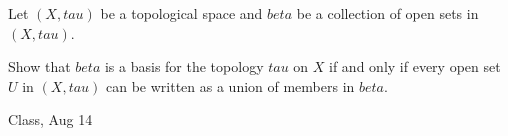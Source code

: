\begin{samepage}
\begin{ex}
Let $(X, tau)$ be a topological space and $beta$ be a collection of open sets in $(X, tau)$. 

Show that $beta$ is a basis for the topology $tau$ on $X$ if and only if every open set $U$ in $(X, tau)$ can be written as a union of members in $beta$.
\end{ex}
\begin{source}
Class, Aug 14
\end{source}
\end{samepage}

